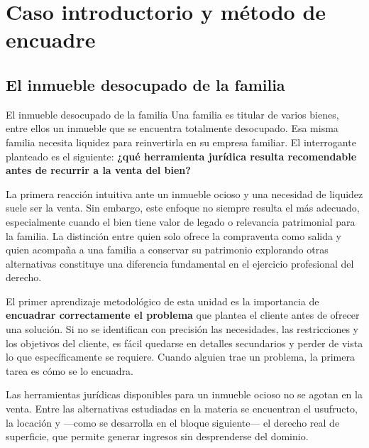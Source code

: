 \documentclass[12pt,oneside]{book}
\begin{document}
\chapter{Caso introductorio y método de encuadre}

\section{El inmueble desocupado de la familia}

\begin{example}{El inmueble desocupado de la familia}
Una familia es titular de varios bienes, entre ellos un inmueble que se encuentra totalmente desocupado. Esa misma familia necesita liquidez para reinvertirla en su empresa familiar. El interrogante planteado es el siguiente: \textbf{¿qué herramienta jurídica resulta recomendable antes de recurrir a la venta del bien?}
\end{example}

La primera reacción intuitiva ante un inmueble ocioso y una necesidad de liquidez suele ser la venta. Sin embargo, este enfoque no siempre resulta el más adecuado, especialmente cuando el bien tiene valor de legado o relevancia patrimonial para la familia. La distinción entre quien solo ofrece la compraventa como salida y quien acompaña a una familia a conservar su patrimonio explorando otras alternativas constituye una diferencia fundamental en el ejercicio profesional del derecho.

\begin{important}
El primer aprendizaje metodológico de esta unidad es la importancia de \textbf{encuadrar correctamente el problema} que plantea el cliente antes de ofrecer una solución. Si no se identifican con precisión las necesidades, las restricciones y los objetivos del cliente, es fácil quedarse en detalles secundarios y perder de vista lo que específicamente se requiere. Cuando alguien trae un problema, la primera tarea es cómo se lo encuadra.
\end{important}

Las herramientas jurídicas disponibles para un inmueble ocioso no se agotan en la venta. Entre las alternativas estudiadas en la materia se encuentran el usufructo, la locación y ---como se desarrolla en el bloque siguiente--- el derecho real de superficie, que permite generar ingresos sin desprenderse del dominio.
\end{document}

